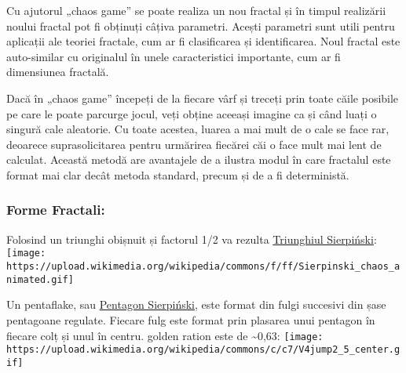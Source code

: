 \documentclass[
]{article}
\begin{document}
Cu ajutorul „chaos game'' se poate realiza un nou fractal și în timpul
realizării noului fractal pot fi obținuți câțiva parametri. Acești
parametri sunt utili pentru aplicații ale teoriei fractale, cum ar fi
clasificarea și identificarea. Noul fractal este auto-similar cu
originalul în unele caracteristici importante, cum ar fi dimensiunea
fractală.

Dacă în „chaos game'' începeți de la fiecare vârf și treceți prin toate
căile posibile pe care le poate parcurge jocul, veți obține aceeași
imagine ca și când luați o singură cale aleatorie. Cu toate acestea,
luarea a mai mult de o cale se face rar, deoarece suprasolicitarea
pentru urmărirea fiecărei căi o face mult mai lent de calculat. Această
metodă are avantajele de a ilustra modul în care fractalul este format
mai clar decât metoda standard, precum și de a fi deterministă.

\hypertarget{forme-fractali}{%
\subsubsection{Forme Fractali:}\label{forme-fractali}}

Folosind un triunghi obișnuit și factorul 1/2 va rezulta
\href{https://en.wikipedia.org/wiki/Sierpi\%C5\%84ski_triangle}{Triunghiul
Sierpiński}:
\texttt{[image: https://upload.wikimedia.org/wikipedia/commons/f/ff/Sierpinski\_chaos\_animated.gif]}

Un pentaflake, sau
\href{https://en.wikipedia.org/wiki/N-flake\#Pentaflake}{Pentagon
Sierpiński}, este format din fulgi succesivi din șase pentagoane
regulate. Fiecare fulg este format prin plasarea unui pentagon în
fiecare colț și unul în centru. golden ration este de
\textasciitilde0,63:
\texttt{[image: https://upload.wikimedia.org/wikipedia/commons/c/c7/V4jump2\_5\_center.gif]}
\end{document}
